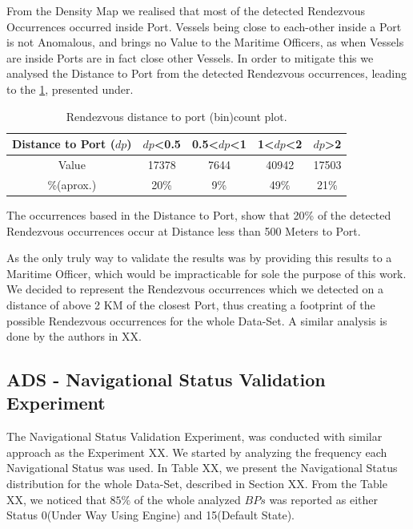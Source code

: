 From the Density Map we realised that most of the detected Rendezvous Occurrences occurred inside Port. Vessels being close to each-other inside a Port is not Anomalous, and brings no Value to the Maritime Officers, as when Vessels are inside Ports are in fact close other Vessels. In order to mitigate this we analysed the Distance to Port from the detected Rendezvous occurrences, leading to the \ref{Table: 5 Distance to Port Rendevouz}, presented under.

\begin{table}[H]
\centering
\caption{Rendezvous distance to port (bin)count plot.}
\label{Table: 5 Distance to Port Rendevouz}
\begin{tabular}{@{}ccccc@{}}
\toprule
Distance to Port ($dp$) & $dp$\textless{}0.5 & 0.5\textless{}$dp$\textless{}1 & 1\textless{}$dp$\textless{}2 & $dp$\textgreater{}2 \\ \midrule
Value                 & 17378              & 7644                             & 40942                          & 17503               \\
\%(aprox.)                    & 20\%               & 9\%                              & 49\%                           & 21\%                \\ \bottomrule
\end{tabular}%
\end{table}

The occurrences based in the Distance to Port, show that 20\% of the detected Rendezvous occurrences occur at Distance less than 500 Meters to Port. 

As the only truly way to validate the results was by providing this results to a Maritime Officer, which would be impracticable for sole the purpose of this work. We decided to represent the Rendezvous occurrences which we detected on a distance of above 2 KM of the closest Port, thus creating a footprint of the possible Rendezvous occurrences for the whole Data-Set. A similar analysis is done by the authors in XX. 


\subsection{ADS - Navigational Status Validation Experiment}
The Navigational Status Validation Experiment, was conducted with similar approach as the Experiment XX. 
We started by analyzing the frequency each Navigational Status was used. In Table XX, we present the   
Navigational Status distribution for the whole Data-Set, described in Section XX.
From the Table XX, we noticed that $85\%$ of the whole analyzed $BPs$ was reported as either Status 0(Under Way Using Engine) and 15(Default State).

